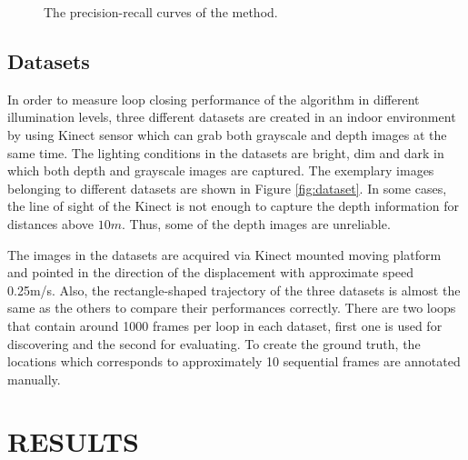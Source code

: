 \documentclass[]{spie}  %
\begin{document}
\begin{figure}
        \hspace{-3mm}
        \caption{The precision-recall curves of the method.}
        \label{fig:pr_curves}
\end{figure}

\subsection{Datasets}

In order to measure loop closing performance of the algorithm in different illumination levels, three different datasets are created in an indoor environment by using Kinect sensor which can grab both grayscale and depth images at the same time. The lighting conditions in the datasets are bright, dim and dark in which both depth and grayscale images are captured. The exemplary images belonging to different datasets are shown in Figure \ref{fig:dataset}. In some cases, the line of sight of the Kinect is not enough to capture the depth information for distances above $10m$. Thus, some of the depth images are unreliable.

The images in the datasets are acquired via Kinect mounted moving platform and pointed in the direction of the displacement with approximate speed 0.25m/s. Also, the rectangle-shaped trajectory of the three datasets is almost the same as the others to compare their performances correctly. There are two loops that contain around 1000 frames per loop in each dataset, first one is used for discovering and the second for evaluating. To create the ground truth, the locations which corresponds to approximately 10 sequential frames are annotated manually. 


\section{RESULTS}
\label{sec:results}
\end{document}
